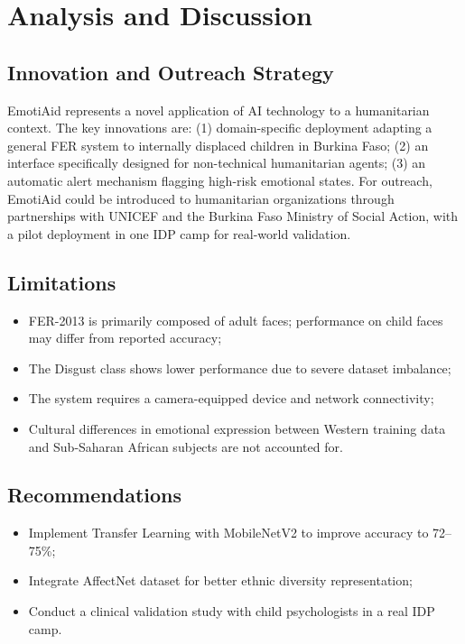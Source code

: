 \documentclass[a4paper,12pt,oneside]{report}
\begin{document}
\section{Analysis and Discussion}

\subsection{Innovation and Outreach Strategy}

EmotiAid represents a novel application of AI technology to a humanitarian context.
The key innovations are: (1) domain-specific deployment adapting a general FER
system to internally displaced children in Burkina Faso; (2) an interface
specifically designed for non-technical humanitarian agents; (3) an automatic
alert mechanism flagging high-risk emotional states. For outreach, EmotiAid could
be introduced to humanitarian organizations through partnerships with UNICEF and
the Burkina Faso Ministry of Social Action, with a pilot deployment in one IDP
camp for real-world validation.

\subsection{Limitations}

\begin{itemize}
    \item FER-2013 is primarily composed of adult faces; performance on child faces
    may differ from reported accuracy;
    \item The Disgust class shows lower performance due to severe dataset imbalance;
    \item The system requires a camera-equipped device and network connectivity;
    \item Cultural differences in emotional expression between Western training data
    and Sub-Saharan African subjects are not accounted for.
\end{itemize}

\subsection{Recommendations}

\begin{itemize}
    \item Implement Transfer Learning with MobileNetV2 to improve accuracy to
    72--75\%;
    \item Integrate AffectNet dataset for better ethnic diversity representation;
    \item Conduct a clinical validation study with child psychologists in a real
    IDP camp.
\end{itemize}
\end{document}

